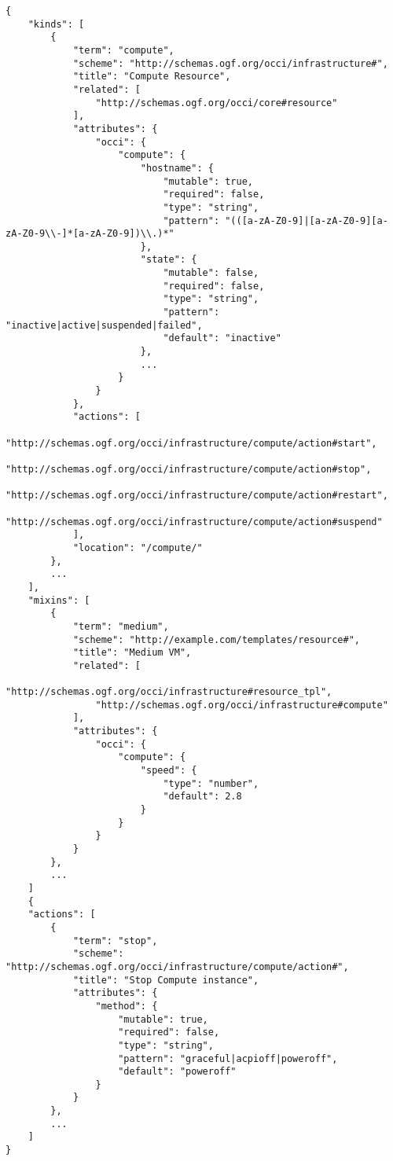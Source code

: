 \documentclass[10pt,a4paper]{article}
\begin{document}
\begin{verbatim}
{
    "kinds": [
        {
            "term": "compute",
            "scheme": "http://schemas.ogf.org/occi/infrastructure#",
            "title": "Compute Resource",
            "related": [
                "http://schemas.ogf.org/occi/core#resource"
            ],
            "attributes": {
                "occi": {
                    "compute": {
                        "hostname": {
                            "mutable": true,
                            "required": false,
                            "type": "string",
                            "pattern": "(([a-zA-Z0-9]|[a-zA-Z0-9][a-zA-Z0-9\\-]*[a-zA-Z0-9])\\.)*"
                        },
                        "state": {
                            "mutable": false,
                            "required": false,
                            "type": "string",
                            "pattern": "inactive|active|suspended|failed",
                            "default": "inactive"
                        },
                        ...
                    }
                }
            },
            "actions": [
                "http://schemas.ogf.org/occi/infrastructure/compute/action#start",
                "http://schemas.ogf.org/occi/infrastructure/compute/action#stop",
                "http://schemas.ogf.org/occi/infrastructure/compute/action#restart",
                "http://schemas.ogf.org/occi/infrastructure/compute/action#suspend"
            ],
            "location": "/compute/"
        },
        ...
    ],
    "mixins": [
        {
            "term": "medium",
            "scheme": "http://example.com/templates/resource#",
            "title": "Medium VM",
            "related": [
                "http://schemas.ogf.org/occi/infrastructure#resource_tpl",
                "http://schemas.ogf.org/occi/infrastructure#compute"
            ],
            "attributes": {
                "occi": {
                    "compute": {
                        "speed": {
                            "type": "number",
                            "default": 2.8
                        }
                    }
                }
            }
        },
        ...
    ]
    {
    "actions": [
        {
            "term": "stop",
            "scheme": "http://schemas.ogf.org/occi/infrastructure/compute/action#",
            "title": "Stop Compute instance",
            "attributes": {
                "method": {
                    "mutable": true,
                    "required": false,
                    "type": "string",
                    "pattern": "graceful|acpioff|poweroff",
                    "default": "poweroff"
                }
            }
        },
		...
	]
}
\end{verbatim}
\end{document}
